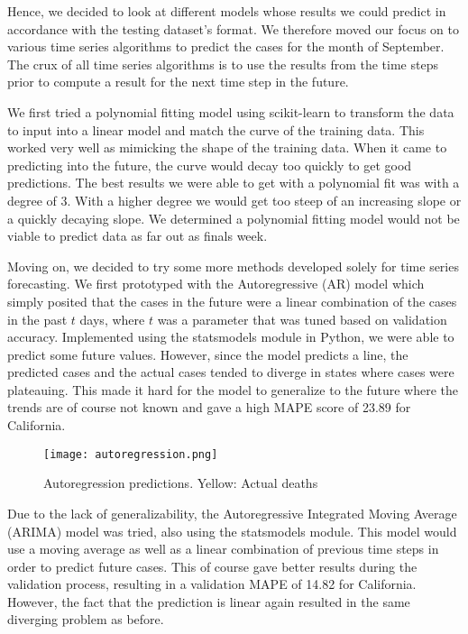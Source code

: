 \documentclass[sigconf]{acmart}
\begin{document}
Hence, we decided to look at different models whose results we could predict in
accordance with the testing dataset’s format. We therefore moved our focus on
to various time series algorithms to predict the cases for the month of
September. The crux of all time series algorithms is to use the results from
the time steps prior to compute a result for the next time step in the future. 

We first tried a polynomial fitting model using scikit-learn to transform the
data to input into a linear model and match the curve of the training data.
This worked very well as mimicking the shape of the training data. When it came
to predicting into the future, the curve would decay too quickly to get good
predictions. The best results we were able to get with a polynomial fit was
with a degree of 3. With a higher degree we would get too steep of an
increasing slope or a quickly decaying slope. We determined a polynomial
fitting model would not be viable to predict data as far out as finals week. 

Moving on, we decided to try some more methods developed solely for time series forecasting.
We first prototyped with the Autoregressive (AR) model which simply posited
that the cases in the future were a linear combination of the cases in the past
$t$ days, where $t$ was a parameter that was tuned based on validation
accuracy. Implemented using the statsmodels \cite{statsmodels} module in
Python, we were able to predict some future values. However, since the model
predicts a line, the predicted cases and the actual cases tended to diverge in
states where cases were plateauing. This made it hard for the model to
generalize to the future where the trends are of course not known and gave a
high MAPE score of 23.89 for California.

\begin{figure}
  \centering
  \texttt{[image: autoregression.png]}
  \caption{Autoregression predictions. Yellow: Actual deaths}
\end{figure}

Due to the lack of generalizability, the Autoregressive Integrated Moving
Average (ARIMA) model was tried, also using the statsmodels module. This model
would use a moving average as well as a linear combination of previous time
steps in order to predict future cases. This of course gave better results
during the validation process, resulting in a validation MAPE of 14.82 for
California. However, the fact that the prediction is linear again resulted in
the same diverging problem as before.
\end{document}
